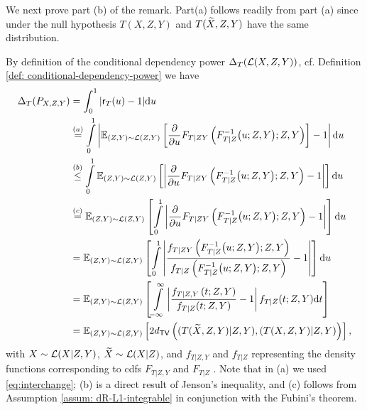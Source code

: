 \documentclass[11pt]{article}
\def\tv{\mathsf{TV}}
\begin{document}
	We next prove part (b) of the remark. Part(a) follows readily from part (a) since under the null hypothesis $T(X,Z,Y)$ and $T({\widetilde{X}},Z,Y)$ have the same distribution.
	
	By definition of the conditional dependency power $\Delta_T(\mathcal{L}(X,Z,Y))$, cf. Definition \ref{def: conditional-dependency-power} we have
	\begin{align*}
		\Delta_T(P_{X,Z,Y})&= \int_0^1 |\sr_T(u)-1|\de u\\
		&\overset{(a)}{=}\int\limits_{0}^{1}\left|\E_{(Z,Y) \sim \cL(Z,Y)}\left[ \frac{\partial}{\partial u} F_{T|ZY}\left( F_{T|Z}^{-1}\big(u;Z,Y\big); Z,Y\right)  \right] -1\right| \de u \\
		&\overset{(b)}{\leq} \int\limits_{0}^{1} \E_{(Z,Y) \sim \cL(Z,Y)}\left[ \left| \frac{\partial}{\partial u} F_{T|ZY}\left( F_{T|Z}^{-1}\big(u;Z,Y\big); Z,Y\right)-1\right|\right]\de u \\
		&\overset{(c)}{=} \E_{(Z,Y) \sim \cL(Z,Y)} \left[ \int\limits_{0}^{1}  \left| \frac{\partial}{\partial u} F_{T|ZY}\left( F_{T|Z}^{-1}\big(u; Z,Y\big); Z,Y\right)-1\right|\right]\de u \\
		&= \E_{(Z,Y) \sim \cL(Z,Y)}  \left[ \int\limits_{0}^{1} \left| \frac{f_{T|ZY}\left( F_{T|Z}^{-1}\big(u; Z,Y\big); Z,Y\right)}{ f_{T|Z}\left( F_{T|Z}^{-1}\big(u; Z,Y\big); Z,Y\right) }-1\right|\right]\de u \\
		&= \E_{(Z,Y) \sim \cL(Z,Y)}  \left[ \int\limits_{-\infty}^{\infty} \left| \frac{f_{T|Z,Y}\left(t;Z,Y \right)}{ f_{T|Z}( t;Z,Y) }-1\right|f_{T|Z}(t;Z,Y)\de t\right]\\
		&=\E_{(Z,Y) \sim \cL(Z,Y)}\left[2d_{\tv}\left(  (T(\tX,Z,Y)|Z,Y), (T(X,Z,Y)|Z,Y) \right)\right], 
	\end{align*}
	with $X\sim \mathcal{L}(X|Z,Y)$, ${\widetilde{X}}\sim \mathcal{L}(X|Z)$, and $f_{T|Z,Y}$ and $f_{T|Z}$ representing the density functions corresponding to cdfs  $F_{T|Z,Y}$ and $F_{T|Z}$ . Note that in (a) we used \eqref{eq:interchange}; (b) is a direct result of Jenson's inequality, and (c) follows from Assumption \ref{assum: dR-L1-integrable} in conjunction with the Fubini's theorem.
	
\end{document}
